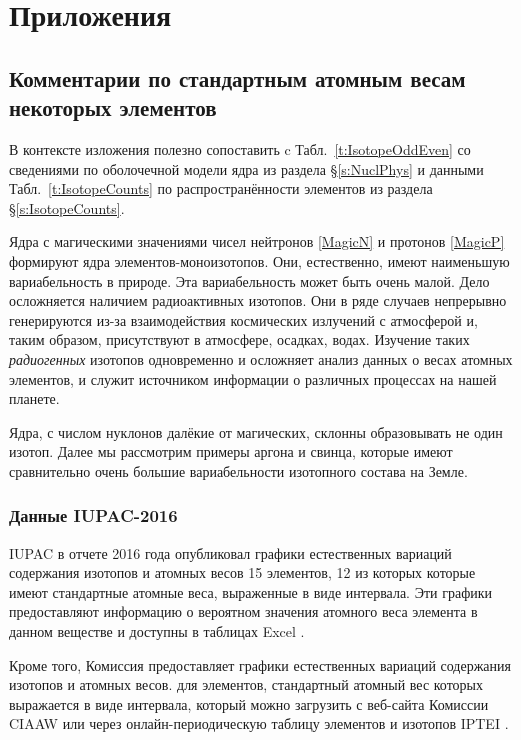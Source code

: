 \documentclass[a5paper,openany]{book}
\begin{document}
\chapter{Приложения}


\section{Комментарии по стандартным атомным весам некоторых элементов}

В контексте изложения полезно сопоставить c   
Табл.~\ref{t:IsotopeOddEven} со сведениями по оболочечной модели ядра из раздела \S\ref{s:NuclPhys} 
и данными Табл.~\ref{t:IsotopeCounts} по распространённости элементов из раздела \S\ref{s:IsotopeCounts}.

Ядра с магическими значениями чисел нейтронов \eqref{MagicN} и протонов \eqref{MagicP} формируют ядра элементов-моноизотопов. Они, естественно, имеют наименьшую вариабельность в природе.
Эта вариабельность может быть очень малой. Дело осложняется наличием радиоактивных изотопов.
Они в ряде случаев непрерывно генерируются из-за взаимодействия космических излучений с атмосферой и, таким образом, присутствуют  в атмосфере, осадках, водах. Изучение таких \emph{радиогенных} изотопов одновременно и осложняет анализ данных о весах атомных элементов, и служит источником информации о различных процессах на нашей планете.

Ядра, с числом нуклонов далёкие от магических, склонны образовывать не один изотоп. Далее мы рассмотрим примеры аргона и свинца, которые имеют сравнительно очень большие вариабельности изотопного состава на Земле.


\subsection{Данные IUPAC-2016}


IUPAC в отчете 2016 года опубликовал графики естественных вариаций содержания изотопов и атомных весов 15 элементов, 12 из которых которые имеют стандартные атомные веса, выраженные в виде интервала. Эти графики предоставляют информацию о вероятном значения атомного веса элемента в данном веществе \cite{IUPAC2016data, IUPAC2019data} и доступны в таблицах Excel \cite{IUPACTables}.

Кроме того, Комиссия предоставляет графики естественных вариаций содержания изотопов и атомных весов.
для элементов, стандартный атомный вес которых выражается в виде интервала, который можно загрузить с
веб-сайта Комиссии CIAAW \cite{CIAAWnaturalVariation} или через онлайн-периодическую таблицу элементов и изотопов IPTEI  \cite{IPTEI}.
\end{document}
